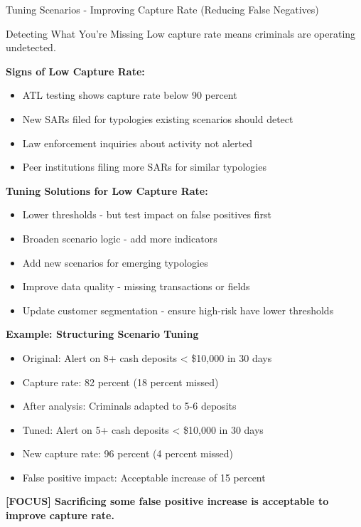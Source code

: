 \documentclass[11pt,a4paper]{beamer}
\newcommand{\examfocus}[1]{\textcolor{orange!80!black}{\textbf{[FOCUS] #1}}}
\begin{document}
	\begin{frame}{Tuning Scenarios - Improving Capture Rate (Reducing False Negatives)}
		\begin{block}{Detecting What You're Missing}
			Low capture rate means criminals are operating undetected.
		\end{block}
		
		\textbf{Signs of Low Capture Rate:}
		\begin{itemize}
			\item ATL testing shows capture rate below 90 percent
			\item New SARs filed for typologies existing scenarios should detect
			\item Law enforcement inquiries about activity not alerted
			\item Peer institutions filing more SARs for similar typologies
		\end{itemize}
		
		\textbf{Tuning Solutions for Low Capture Rate:}
		\begin{itemize}
			\item Lower thresholds - but test impact on false positives first
			\item Broaden scenario logic - add more indicators
			\item Add new scenarios for emerging typologies
			\item Improve data quality - missing transactions or fields
			\item Update customer segmentation - ensure high-risk have lower thresholds
		\end{itemize}
		
		\textbf{Example: Structuring Scenario Tuning}
		\begin{itemize}
			\item Original: Alert on 8+ cash deposits < \$10,000 in 30 days
			\item Capture rate: 82 percent (18 percent missed)
			\item After analysis: Criminals adapted to 5-6 deposits
			\item Tuned: Alert on 5+ cash deposits < \$10,000 in 30 days
			\item New capture rate: 96 percent (4 percent missed)
			\item False positive impact: Acceptable increase of 15 percent
		\end{itemize}
		
		\examfocus{Sacrificing some false positive increase is acceptable to improve capture rate.}
	\end{frame}
	
\end{document}
